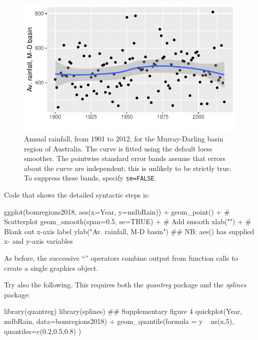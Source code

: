 \begin{figure}
\begin{Schunk}


\centerline{\includegraphics[width=\textwidth]{figs/07-qplot-smooth-1} }

\end{Schunk}
\caption{Annual rainfall, from 1901 to 2012, for the Murray-Darling
  basin region of Australia.  The curve is fitted using the default
  loess smoother. The pointwise standard error bands assume that
  errors about the curve are independent; this is unlikely to be
  strictly true. To suppress these bands, specify
  \texttt{se=FALSE}.\label{fig:ggrain}}
\end{figure}

Code that shows the detailed syntactic steps is:
\begin{Schunk}
\begin{Sinput}
ggplot(bomregions2018, aes(x=Year, y=mdbRain)) +
  geom_point() +                      # Scatterplot
  geom_smooth(span=0.5, se=TRUE) +    # Add smooth
  xlab("") +             # Blank out x-axis label
  ylab("Av. rainfall, M-D basin")
## NB: aes() has supplied x- and y-axis variables
\end{Sinput}
\end{Schunk}
As before, the successive ``\txtt{+}'' operators combine output from
function calls to create a single graphics object.

Try also the following.  This requires both the {\em quantreg}
package and the {\em splines} package:
\begin{Schunk}
\begin{Sinput}
library(quantreg)
library(splines)
## Supplementary figure 4
quickplot(Year, mdbRain, data=bomregions2018) +
          geom_quantile(formula = y ~ ns(x,5),
          quantiles=c(0.2,0.5,0.8) )
\end{Sinput}
\end{Schunk}

